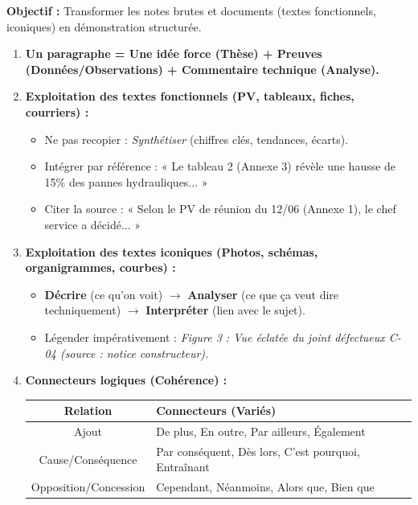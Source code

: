 \documentclass[11pt]{article}
\begin{document}
\begin{methode}
    \textbf{Objectif :} Transformer les notes brutes et documents (textes fonctionnels, iconiques) en démonstration structurée.
    \begin{enumerate}
        \item \textbf{Un paragraphe = Une idée force (Thèse) + Preuves (Données/Observations) + Commentaire technique (Analyse).}
        \item \textbf{Exploitation des textes fonctionnels (PV, tableaux, fiches, courriers) :}
            \begin{itemize}
                \item Ne pas recopier : \emph{Synthétiser} (chiffres clés, tendances, écarts).
                \item Intégrer par référence : « Le tableau 2 (Annexe 3) révèle une hausse de 15\% des pannes hydrauliques... »
                \item Citer la source : « Selon le PV de réunion du 12/06 (Annexe 1), le chef service a décidé... »
            \end{itemize}
        \item \textbf{Exploitation des textes iconiques (Photos, schémas, organigrammes, courbes) :}
            \begin{itemize}
                \item \textbf{Décrire} (ce qu'on voit) $\rightarrow$ \textbf{Analyser} (ce que ça veut dire techniquement) $\rightarrow$ \textbf{Interpréter} (lien avec le sujet).
                \item Légender impérativement : \emph{Figure 3 : Vue éclatée du joint défectueux C-04 (source : notice constructeur).}
            \end{itemize}
        \item \textbf{Connecteurs logiques (Cohérence) :}
            \begin{center}
                \begin{tabular}{|c|l|}\hline
                \textbf{Relation} & \textbf{Connecteurs (Variés)} \\\hline
                Ajout & De plus, En outre, Par ailleurs, Également \\\hline
                Cause/Conséquence & Par conséquent, Dès lors, C'est pourquoi, Entraînant \\\hline
                Opposition/Concession & Cependant, Néanmoins, Alors que, Bien que \\\hline

\end{tabular}
\end{center}
\end{enumerate}
\end{methode}
\end{document}
